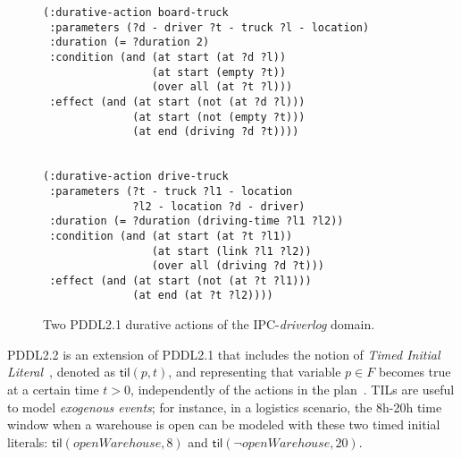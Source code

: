 \documentclass{ecai}
\newcommand{\dur}{\mathsf{dur}}    %
\newcommand{\start}{\mathsf{start}}%
\newcommand{\en}{\mathsf{end}}     %
\newcommand{\til}{\mathsf{til}}    %
\begin{document}
\begin{figure} 
\begin{scriptsize}  
\begin{verbatim}
(:durative-action board-truck
 :parameters (?d - driver ?t - truck ?l - location)
 :duration (= ?duration 2)
 :condition (and (at start (at ?d ?l)) 
                 (at start (empty ?t))
                 (over all (at ?t ?l)))
 :effect (and (at start (not (at ?d ?l))) 
              (at start (not (empty ?t)))
              (at end (driving ?d ?t))))


(:durative-action drive-truck
 :parameters (?t - truck ?l1 - location 
              ?l2 - location ?d - driver)
 :duration (= ?duration (driving-time ?l1 ?l2))
 :condition (and (at start (at ?t ?l1)) 
                 (at start (link ?l1 ?l2))
                 (over all (driving ?d ?t)))
 :effect (and (at start (not (at ?t ?l1))) 
              (at end (at ?t ?l2))))
\end{verbatim}
\end{scriptsize}    
\caption{Two PDDL2.1 durative actions of the IPC-{\em driverlog} domain.}
\label{fig:exampleactions2}
\end{figure}


PDDL2.2 is an extension of PDDL2.1 that includes the notion of {\em Timed Initial Literal}~\cite{hoffmann2005}, denoted as $\til(p,t)$, and representing that variable $p\in F$ becomes true at a certain time $t>0$, independently of the actions in the plan~\cite{Edelkamp04}. TILs are useful to model {\em exogenous events}; for instance, in a logistics scenario, the 8h-20h time window when a warehouse is open can be modeled with these two timed initial literals: $\til(openWarehouse,8)$ and $\til(\neg openWarehouse,20)$.

\end{document}
